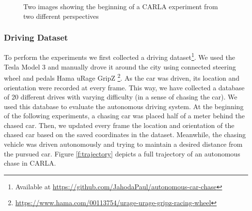 \documentclass{ctuthesis/ctuthesis}
\begin{document}
\begin{figure}[]
    \centering
    \qquad
    \caption{Two images showing the beginning of a CARLA experiment from two different perspectives}%
    \label{fig:CARLA}%
\end{figure}





\subsubsection{Driving Dataset} \label{s:drivingDataset}
To perform the experiments we first collected a driving dataset\footnote{Available at \href{https://github.com/JahodaPaul/autonomous-car-chase}{https://github.com/JahodaPaul/autonomous-car-chase}}. We used the Tesla Model 3 and manually drove it around the city using connected steering wheel and pedals Hama uRage GripZ \footnote{\href{https://www.hama.com/00113754/urage-urage-gripz-racing-wheel}{https://www.hama.com/00113754/urage-urage-gripz-racing-wheel}}. As the car was driven, its location and orientation were recorded at every frame. This way, we have collected a database of 20 different drives with varying difficulty (in a sense of chasing the car). We used this database to evaluate the autonomous driving system. At the beginning of the following experiments, a chasing car was placed half of a meter behind the chased car. Then, we updated every frame the location and orientation of the chased car based on the saved coordinates in the dataset. Meanwhile, the chasing vehicle was driven autonomously and trying to maintain a desired distance from the pursued car. Figure \ref{f:trajectory} depicts a full trajectory of an autonomous chase in CARLA.\par
\end{document}
